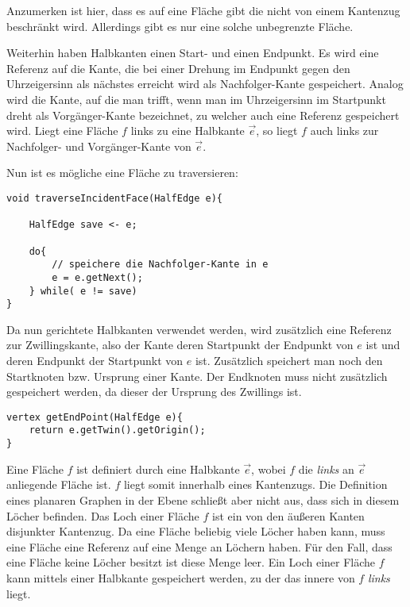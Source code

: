 \documentclass[a4paper]{article}
\begin{document}
Anzumerken ist hier, dass es auf eine Fläche gibt die nicht von einem Kantenzug beschränkt wird. Allerdings gibt es nur eine solche unbegrenzte Fläche.

Weiterhin haben Halbkanten einen Start- und einen Endpunkt. Es wird eine Referenz auf die Kante, die bei einer Drehung im Endpunkt gegen den Uhrzeigersinn als nächstes erreicht wird als Nachfolger-Kante gespeichert. Analog wird die Kante, auf die man trifft, wenn man im Uhrzeigersinn im Startpunkt dreht als Vorgänger-Kante bezeichnet, zu welcher auch eine Referenz gespeichert wird. Liegt eine Fläche $f$ links zu eine Halbkante $\vec{e}$, so liegt $f$ auch links zur Nachfolger- und Vorgänger-Kante von $\vec{e}$.

Nun ist es mögliche eine Fläche zu traversieren:

\begin{lstlisting}
void traverseIncidentFace(HalfEdge e){

	HalfEdge save <- e;
	
	do{
		// speichere die Nachfolger-Kante in e
		e = e.getNext();
	} while( e != save)
}
\end{lstlisting}

Da nun gerichtete Halbkanten verwendet werden, wird zusätzlich eine Referenz zur Zwillingskante, also der Kante deren Startpunkt der Endpunkt von $e$ ist und deren Endpunkt der Startpunkt von $e$ ist. Zusätzlich speichert man noch den Startknoten bzw. Ursprung einer Kante. Der Endknoten muss nicht zusätzlich gespeichert werden, da dieser der Ursprung des Zwillings ist.

\begin{lstlisting}
vertex getEndPoint(HalfEdge e){
	return e.getTwin().getOrigin();
}
\end{lstlisting}

Eine Fläche $f$ ist definiert durch eine Halbkante $\vec{e}$, wobei $f$ die \textit{links} an $\vec{e}$ anliegende Fläche ist. $f$ liegt somit innerhalb eines Kantenzugs. Die Definition eines planaren Graphen in der Ebene schließt aber nicht aus, dass sich in diesem Löcher befinden. Das Loch einer Fläche $f$ ist ein von den äußeren Kanten disjunkter Kantenzug. Da eine Fläche beliebig viele Löcher haben kann, muss eine Fläche eine Referenz auf eine Menge an Löchern haben. Für den Fall, dass eine Fläche keine Löcher besitzt ist diese Menge leer. Ein Loch einer Fläche $f$ kann mittels einer Halbkante gespeichert werden, zu der das innere von $f$ \textit{links} liegt.
\end{document}
